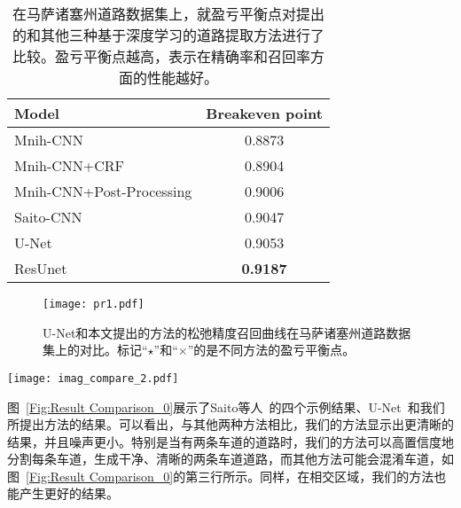 \begin{translation}
\begin{table}[!hbp]
  \begin{center}
  \caption{在马萨诸塞州道路数据集上，就盈亏平衡点对提出的和其他三种基于深度学习的道路提取方法进行了比较。盈亏平衡点越高，表示在精确率和召回率方面的性能越好。}
  \label{Table:Value at Breakeven Point}
  \begin{tabular}{l|c}
  \hline
  Model & Breakeven point\\
  \hline
  Mnih-CNN\cite{2} & 0.8873  \\
  \hline
  Mnih-CNN+CRF\cite{2} & 0.8904  \\
  \hline
  Mnih-CNN+Post-Processing\cite{2} & 0.9006  \\
  \hline
  Saito-CNN\cite{5} & 0.9047 \\
  \hline
  U-Net\cite{24} & 0.9053 \\
  \hline
  ResUnet & \textbf{0.9187} \\
  \hline
  \end{tabular}
  \end{center}
\end{table}

\begin{figure}[!t]
  \begin{center}
      \texttt{[image: pr1.pdf]}
        \caption{U-Net和本文提出的方法的松弛精度召回曲线在马萨诸塞州道路数据集上的对比。标记“$\star$”和“$\times$”的是不同方法的盈亏平衡点。}
        \label{Fig:PR}
  \end{center}
  \end{figure}
  
  \begin{figure*}[ht]
  \begin{center}
      \texttt{[image: imag\_compare\_2.pdf]}
        \caption{马萨诸塞州道路数据集测试集的结果示例。(a) 输入图像；(b) 地面真相；(c) Saito等人~\cite{5}；(d) U-Net ~\cite{24}；(e) 本文方法结果。放大以查看更多详细信息。}
        \label{Fig:Result Comparison_0}
  \end{center}
\end{figure*}

图~\ref{Fig:Result Comparison_0}展示了Saito等人~\cite{5}的四个示例结果、U-Net~\cite{24}和我们所提出方法的结果。可以看出，与其他两种方法相比，我们的方法显示出更清晰的结果，并且噪声更小。特别是当有两条车道的道路时，我们的方法可以高置信度地分割每条车道，生成干净、清晰的两条车道道路，而其他方法可能会混淆车道，如图~\ref{Fig:Result Comparison_0}的第三行所示。同样，在相交区域，我们的方法也能产生更好的结果。


\end{translation}
